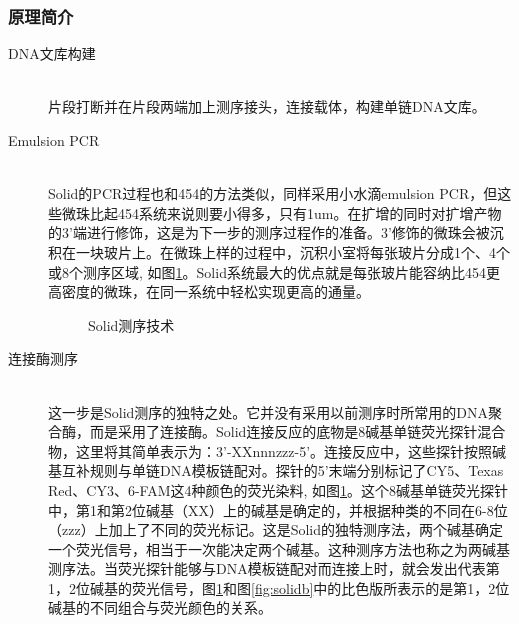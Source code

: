 \documentclass[12pt]{article} %
\begin{document}
\subsubsection{原理简介}

\begin{description}
	\item[DNA文库构建] \hfill \\
	片段打断并在片段两端加上测序接头，连接载体，构建单链DNA文库。
	\item[Emulsion PCR] \hfill \\
	 Solid的PCR过程也和454的方法类似，同样采用小水滴emulsion PCR，但这些微珠比起454系统来说则要小得多，只有1um。在扩增的同时对扩增产物的3’端进行修饰，这是为下一步的测序过程作的准备。3’修饰的微珠会被沉积在一块玻片上。在微珠上样的过程中，沉积小室将每张玻片分成1个、4个或8个测序区域, 如图\ref{fig:solida}。Solid系统最大的优点就是每张玻片能容纳比454更高密度的微珠，在同一系统中轻松实现更高的通量。
	
	
		\begin{figure}[H] %
		\caption{Solid测序技术}
		\label{fig:solida}
	\end{figure}
	
	\item[连接酶测序] \hfill \\
	这一步是Solid测序的独特之处。它并没有采用以前测序时所常用的DNA聚合酶，而是采用了连接酶。Solid连接反应的底物是8碱基单链荧光探针混合物，这里将其简单表示为：3’-XXnnnzzz-5’。连接反应中，这些探针按照碱基互补规则与单链DNA模板链配对。探针的5’末端分别标记了CY5、Texas Red、CY3、6-FAM这4种颜色的荧光染料, 如图\ref{fig:solida}。这个8碱基单链荧光探针中，第1和第2位碱基（XX）上的碱基是确定的，并根据种类的不同在6-8位（zzz）上加上了不同的荧光标记。这是Solid的独特测序法，两个碱基确定一个荧光信号，相当于一次能决定两个碱基。这种测序方法也称之为两碱基测序法。当荧光探针能够与DNA模板链配对而连接上时，就会发出代表第1，2位碱基的荧光信号，图\ref{fig:solida}和图\ref{fig:solidb}中的比色版所表示的是第1，2位碱基的不同组合与荧光颜色的关系。
	

\end{description}
\end{document}
